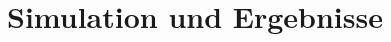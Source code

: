 \documentclass{article}
\begin{document}
  \section{Simulation und Ergebnisse} %
  \label{sec:simulation_und_ergebnisse}

\end{document}
